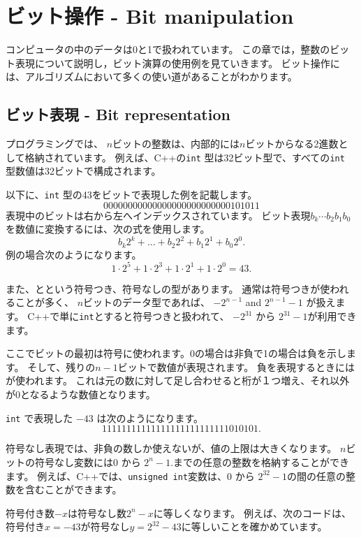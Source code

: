\chapter{ビット操作 - Bit manipulation}

コンピュータの中のデータは0と1で扱われています。
この章では，整数のビット表現について説明し，ビット演算の使用例を見ていきます。
ビット操作には、アルゴリズムにおいて多くの使い道があることがわかります。

\section{ビット表現 - Bit representation}


プログラミングでは、
$n$ビットの整数は、内部的には$n$ビットからなる2進数として格納されています。
例えば、C++の\texttt{int} 型は32ビット型で、すべての\texttt{int} 型数値は32ビットで構成されます。

以下に、\texttt{int} 型の43をビットで表現した例を記載します。
\[00000000000000000000000000101011\]
表現中のビットは右から左へインデックスされています。
ビット表現$b_k \cdots b_2 b_1 b_0$  を数値に変換するには、次の式を使用します。
\[b_k 2^k + \ldots + b_2 2^2 + b_1 2^1 + b_0 2^0.\]
例の場合次のようになります。
\[1 \cdot 2^5 + 1 \cdot 2^3 + 1 \cdot 2^1 + 1 \cdot 2^0 = 43.\]

また、とという符号つき、符号なしの型があります。
通常は符号つきが使われることが多く、
$n$ビットのデータ型であれば、
$-2^{n-1}$ and $2^{n-1}-1$
が扱えます。
C++で単に\texttt{int}とすると符号つきと扱われて、
$-2^{31}$ から $2^{31}-1$が利用できます。

ここでビットの最初は符号に使われます。0の場合は非負で1の場合は負を示します。
そして、残りの$n-1$ビットで数値が表現されます。
負を表現するときにはが使われます。
これは元の数に対して足し合わせると桁が１つ増え、それ以外が0となるような数値となります。

\texttt{int} で表現した $-43$ は次のようになります。
\[11111111111111111111111111010101.\]


符号なし表現では、非負の数しか使えないが、値の上限は大きくなります。
$n$ビットの符号なし変数には$0$ から $2^n-1$.までの任意の整数を格納することができます。
例えば、C++では、\texttt{unsigned int}変数は、$0$ から $2^{32}-1$の間の任意の整数を含むことができます。

符号付き数$-x$は符号なし数$2^n-x$に等しくなります。
例えば、次のコードは、符号付き$x = -43$が符号なし$y=2^{32}-43$に等しいことを確かめています。

